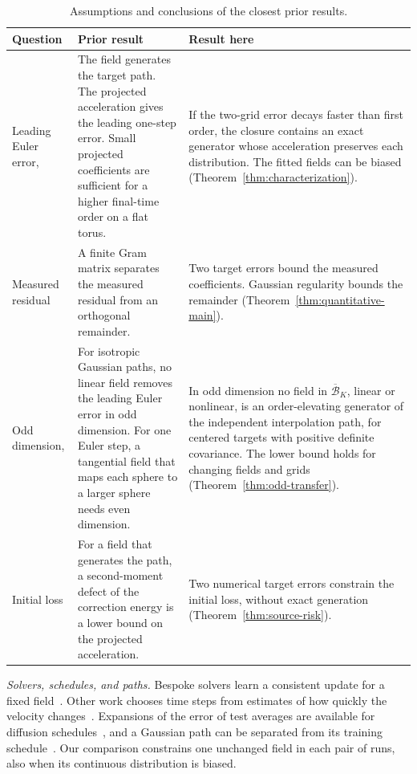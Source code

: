 \begin{table}[t]
\caption{Assumptions and conclusions of the closest prior results.}
\label{tab:prior}
\centering
\footnotesize
\begin{tabular}{@{}p{}p{}p{}@{}}
\toprule
Question & Prior result & Result here\\
\midrule
Leading Euler error\newline\citep[Thm.~2]{obzherin2026density},
\citep[Cor.~8]{obzherin2026finite}
& The field generates the target path. The projected acceleration gives
the leading one-step error. Small projected coefficients are sufficient
for a higher final-time order on a flat torus.
& If the two-grid error decays faster than first order, the closure
contains an exact generator whose acceleration preserves each
distribution. The fitted fields can be biased
(Theorem~\ref{thm:characterization}).\\[2pt]
Measured residual\newline\citep[Prop.~10]{obzherin2026finite}
& A finite Gram matrix separates the measured residual from an
orthogonal remainder.
& Two target errors bound the measured coefficients. Gaussian
regularity bounds the remainder
(Theorem~\ref{thm:quantitative-main}).\\[2pt]
Odd dimension\newline\citep[Thm.~12]{obzherin2026density},
\citep[Thm.~34]{obzherin2026finite}
& For isotropic Gaussian paths, no linear field removes the leading
Euler error in odd dimension. For one Euler step, a tangential field
that maps each sphere to a larger sphere needs even dimension.
& In odd dimension no field in $\overline{\mathcal B}_K$, linear or
nonlinear, is an order-elevating generator of the independent
interpolation path, for centered targets with positive definite
covariance. The
lower bound holds for changing fields and grids
(Theorem~\ref{thm:odd-transfer}).\\[2pt]
Initial loss\newline\citep[Prop.~30]{obzherin2026finite}
& For a field that generates the path, a second-moment defect of the
correction energy is a lower bound on the projected acceleration.
& Two numerical target errors constrain the initial loss, without exact
generation (Theorem~\ref{thm:source-risk}).\\
\bottomrule
\end{tabular}
\end{table}

\emph{Solvers, schedules, and paths.} Bespoke solvers learn a
consistent update for a fixed field~\citep{shaul2024bespoke}. Other work
chooses time steps from estimates of how quickly the velocity
changes~\citep{gupta2026sharpeuler}. Expansions of the error of test
averages are available for diffusion
schedules~\citep{hurault2026geometry}, and a Gaussian path can be
separated from its training schedule~\citep{claustre2026gaussian}. Our comparison constrains one
unchanged field in each pair of runs, also when its continuous
distribution is biased.

